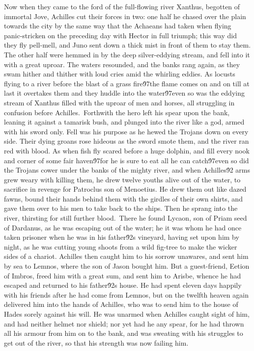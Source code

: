 {  Now when they came to the ford of the full-flowing river Xanthus, begotten of immortal Jove, Achilles cut their forces in two: one half he chased over the plain towards the city by the same way that the Achaeans had taken when flying panic-stricken on the preceding day with Hector in full triumph; this way did they fly pell-mell, and Juno sent down a thick mist in front of them to stay them. The other half were hemmed in by the deep silver-eddying stream, and fell into it with a great uproar. The waters resounded, and the banks rang again, as they swam hither and thither with loud cries amid the whirling eddies. As locusts flying to a river before the blast of a grass fire\'97the flame comes on and on till at last it overtakes them and they huddle into the water\'97even so was the eddying stream of Xanthus filled with the uproar of men and horses, all struggling in confusion before Achilles.\
Forthwith the hero left his spear upon the bank, leaning it against a tamarisk bush, and plunged into the river like a god, armed with his sword only. Fell was his purpose as he hewed the Trojans down on every side. Their dying groans rose hideous as the sword smote them, and the river ran red with blood. As when fish fly scared before a huge dolphin, and fill every nook and corner of some fair haven\'97for he is sure to eat all he can catch\'97even so did the Trojans cower under the banks of the mighty river, and when Achilles\'92 arms grew weary with killing them, he drew twelve youths alive out of the water, to sacrifice in revenge for Patroclus son of Menoetius. He drew them out like dazed fawns, bound their hands behind them with the girdles of their own shirts, and gave them over to his men to take back to the ships. Then he sprang into the river, thirsting for still further blood.\
There he found Lycaon, son of Priam seed of Dardanus, as he was escaping out of the water; he it was whom he had once taken prisoner when he was in his father\'92s vineyard, having set upon him by night, as he was cutting young shoots from a wild fig-tree to make the wicker sides of a chariot. Achilles then caught him to his sorrow unawares, and sent him by sea to Lemnos, where the son of Jason bought him. But a guest-friend, Eetion of Imbros, freed him with a great sum, and sent him to Arisbe, whence he had escaped and returned to his father\'92s house. He had spent eleven days happily with his friends after he had come from Lemnos, but on the twelfth heaven again delivered him into the hands of Achilles, who was to send him to the house of Hades sorely against his will. He was unarmed when Achilles caught sight of him, and had neither helmet nor shield; nor yet had he any spear, for he had thrown all his armour from him on to the bank, and was sweating with his struggles to get out of the river, so that his strength was now failing him.\
}
